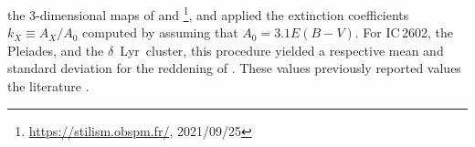 \documentclass[12pt,modern,twocolumn,tighten,linenumbers]{aastex63}
\newcommand{\cn}{$\delta$\ Lyr\ cluster} %
\begin{document}
 the
3-dimensional maps of \citet{capitanio_threedimensional_2017} and
\citet{lallement_threedimensional_2018}\footnote{\url{https://stilism.obspm.fr/},
2021/09/25}, and applied the extinction coefficients $k_X\equiv
A_X/A_0$ computed by \citet{GaiaCollaboration2018} assuming that $A_0
= 3.1 E(B-V)$.  For IC\,2602, the Pleiades, and the \cn, this
procedure yielded a respective mean and standard deviation for the
reddening of .
These values  previously reported values
 the literature \citep{pecaut_star_2016,GaiaCollaboration2018,KounkelCovey2019,bossini_age_2019}.

%
%
%
\end{document}
